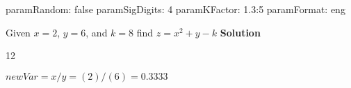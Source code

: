 paramRandom: false
paramSigDigits: 4
paramKFactor: 1.3:5
paramFormat: eng


\question Given \mbox{$x = 2$}, \mbox{$y = 6$}, and \mbox{$k = 8$} find $z = x^2+y-k$
\textbf{Solution}
\\ 

12

\mbox{$newVar = x/y  =  (2)/(6) = 0.3333$}

